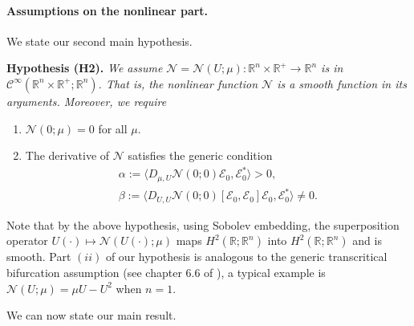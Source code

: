 \documentclass[letterpaper,11pt]{article}
\newcommand{\R}{\mathbb{R}}
\newcommand{\Nl}{\mathcal{N}}
\numberwithin{equation}{section}
\newenvironment{Hypothesis}[1]%
  {\begin{trivlist}\item[]{\bf Hypothesis #1 }\em}{\end{trivlist}}
\theoremstyle{plain}
\theoremstyle{remark}
\begin{document}
\paragraph{Assumptions on the nonlinear part.}

We state our second main hypothesis.
\begin{Hypothesis} {(H2).} We assume $\Nl=\Nl(U;\mu):\R^n \times \R^+ \to \R^n $ is in $\mathscr{C}^{\infty}(\R^n \times \R^+; \R^n)$. That is, the nonlinear function $\Nl$ is a smooth function in its arguments. Moreover, we require
\begin{enumerate}
\item $\Nl(0;\mu) = 0$ for all $\mu$.

\item The derivative of $\Nl$ satisfies the generic condition 
\begin{eqnarray}
\alpha := \langle D_{\mu,U} \Nl(0;0)\mathcal{E}_0, \mathcal{E}_0^*\rangle > 0
 \label{muvCoe}, \\ 
\beta := \langle D_{U,U} \Nl(0;0)[\mathcal{E}_0,\mathcal{E}_0]\mathcal{E}_0, \mathcal{E}_0^*\rangle \neq 0  \label{QuadCoe}.
\end{eqnarray}


\end{enumerate}

\end{Hypothesis}

Note that by the above hypothesis, using Sobolev embedding, the superposition operator $U(\cdot) \mapsto \Nl(U(\cdot);\mu)$ maps $H^2(\R;\R^n)$ into $H^2(\R;\R^n)$ and is smooth. Part $(ii)$ of our hypothesis is analogous to the generic transcritical bifurcation assumption (see chapter 6.6 of \cite{chow1982methods}), a typical example is $\Nl(U;\mu)=\mu U-U^2$ when $n=1$.


We can now state our main result.
 
\end{document}

